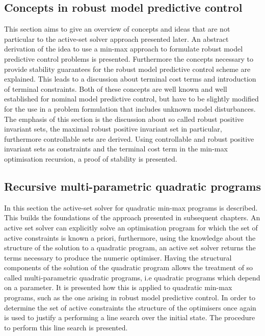\documentclass[a4paper,12pt]{scrartcl}
\begin{document}
\subsection{Concepts in robust model predictive control}\label{chap:concepts}
This section aims to give an overview of concepts and ideas that are not particular to
the active-set solver approach presented later.
%
An abstract derivation of the idea to use a min-max approach to formulate robust model predictive control
problems is presented.
%
Furthermore the concepts necessary to provide stability guarantees for the robust model predictive control
scheme are explained.
%
This leads to a discussion about terminal cost terms and introduction of terminal constraints. 
%
Both of these concepts are well known and well established for nominal model predictive control, but have to 
be slightly modified for the use in a problem formulation that includes unknown model disturbances. 
%
The emphasis of this section is the discussion about so called robust positive invariant sets, the maximal
robust positive invariant set in particular, furthermore controllable sets are derived.
%
Using controllable and robust positive invariant sets as constraints and the terminal cost term in the min-max optimisation
recursion, a proof of stability is presented.

\subsection{Recursive multi-parametric quadratic programs}\label{chap:recursive:mpqp}
In this section the active-set solver for quadratic min-max programs is described.
%
This builds the foundations of the approach presented in subsequent chapters.
%
An active set solver can explicitly solve an optimisation program for which the set of active constraints is
known a priori, furthermore, using the knowledge about the structure of the solution to a quadratic program,
an active set solver returns the terms necessary to produce the numeric optimiser.
%
Having the structural components of the solution of the quadratic program allows the treatment of so called
multi-parametric quadratic programs, i.e quadratic programs which depend on a parameter.
%
It is presented how this is applied to quadratic min-max programs, such as the one arising in robust model
predictive control.
%
In order to determine the set of active constraints the structure of the optimisers once again is used to
justify a performing a line search over the initial state.
%
The procedure to perform this line search is presented.
\end{document}
